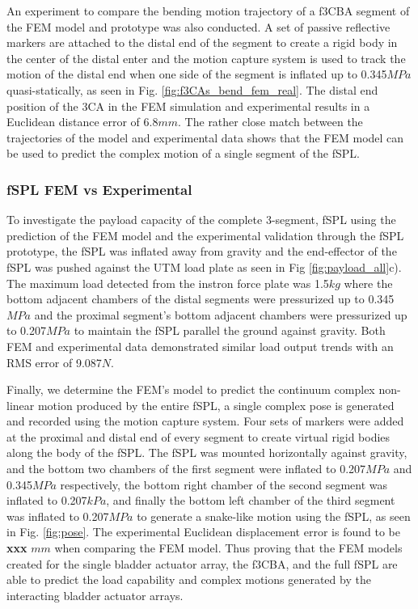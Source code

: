 \documentclass[letterpaper, 10 pt, conference]{ieeeconf}  %
\begin{document}
An experiment to compare the bending motion trajectory of a f3CBA segment of the FEM model and prototype was also conducted. A set of passive reflective markers are attached to the distal end of the segment to create a rigid body in the center of the distal enter and the motion capture system is used to track the motion of the distal end when one side of the segment is inflated up to 0.345$MPa$ quasi-statically, as seen in Fig. \ref{fig:f3CAs_bend_fem_real}. The distal end position of the 3CA in the FEM simulation and experimental results in a Euclidean distance error of 6.8$mm$. The rather close match between the trajectories of the model and experimental data shows that the FEM model can be used to predict the complex motion of a single segment of the fSPL.

\subsubsection{fSPL FEM vs Experimental}

To investigate the payload capacity of the complete 3-segment, fSPL using the prediction of the FEM model and the experimental validation through the fSPL prototype, the fSPL was inflated away from gravity and the end-effector of the fSPL was pushed against the UTM load plate as seen in Fig \ref{fig:payload_all}c). The maximum load detected from the instron force plate was 1.5$kg$ where the bottom adjacent chambers of the distal segments were pressurized up to 0.345$MPa$ and the proximal segment’s bottom adjacent chambers were pressurized up to 0.207$MPa$ to maintain the fSPL parallel the ground against gravity. Both FEM and experimental data demonstrated similar load output trends with an RMS error of 9.087$N$. 

Finally, we determine the FEM’s model to predict the continuum complex non-linear motion produced by the entire fSPL, a single complex pose is generated and recorded using the motion capture system. Four sets of markers were added at the proximal and distal end of every segment to create virtual rigid bodies along the body of the fSPL. The fSPL was mounted horizontally against gravity, and the bottom two chambers of the first segment were inflated to 0.207$MPa$ and 0.345$MPa$ respectively, the bottom right chamber of the second segment was inflated to 0.207$kPa$, and finally the bottom left chamber of the third segment was inflated to 0.207$MPa$ to generate a snake-like motion using the fSPL, as seen in Fig. \ref{fig:pose}. The experimental Euclidean displacement error is found to be \textbf{xxx} $mm$ when comparing the FEM model. Thus proving that the FEM models created for the single bladder actuator array, the f3CBA, and the full fSPL are able to predict the load capability and complex motions generated by the interacting bladder actuator arrays.
\end{document}
